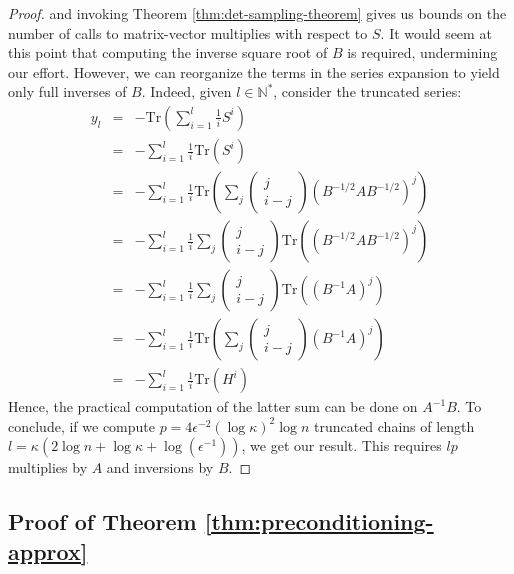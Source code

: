 \begin{proof}
and invoking Theorem \ref{thm:det-sampling-theorem} gives us bounds
on the number of calls to matrix-vector multiplies with respect to
$S$. It would seem at this point that computing the inverse square
root of $B$ is required, undermining our effort. However, we can
reorganize the terms in the series expansion to yield only full inverses
of $B$. Indeed, given $l\in\mathbb{N}^{*}$, consider the truncated
series: 
\begin{eqnarray*}
y_{l} & = & -\mbox{Tr}\left(\sum_{i=1}^{l}\frac{1}{i}S^{i}\right)\\
 & = & -\sum_{i=1}^{l}\frac{1}{i}\mbox{Tr}\left(S^{i}\right)\\
 & = & -\sum_{i=1}^{l}\frac{1}{i}\mbox{Tr}\left(\sum_{j}\left(\begin{array}{c}
j\\
i-j
\end{array}\right)\left(B^{-1/2}AB^{-1/2}\right)^{j}\right)\\
 & = & -\sum_{i=1}^{l}\frac{1}{i}\sum_{j}\left(\begin{array}{c}
j\\
i-j
\end{array}\right)\mbox{Tr}\left(\left(B^{-1/2}AB^{-1/2}\right)^{j}\right)\\
 & = & -\sum_{i=1}^{l}\frac{1}{i}\sum_{j}\left(\begin{array}{c}
j\\
i-j
\end{array}\right)\mbox{Tr}\left(\left(B^{-1}A\right)^{j}\right)\\
 & = & -\sum_{i=1}^{l}\frac{1}{i}\mbox{Tr}\left(\sum_{j}\left(\begin{array}{c}
j\\
i-j
\end{array}\right)\left(B^{-1}A\right)^{j}\right)\\
 & = & -\sum_{i=1}^{l}\frac{1}{i}\mbox{Tr}\left(H^{i}\right)
\end{eqnarray*}
Hence, the practical computation of the latter sum can be done on
$A^{-1}B$. To conclude, if we compute $p=4\epsilon^{-2}\left(\log\kappa\right)^{2}\log n$
truncated chains of length $l=\kappa\left(2\log n+\log\kappa+\log\left(\epsilon^{-1}\right)\right)$,
we get our result. This requires $lp$ multiplies by $A$ and inversions
by $B$. \end{proof} 


\subsection{Proof of Theorem \ref{thm:preconditioning-approx}}

